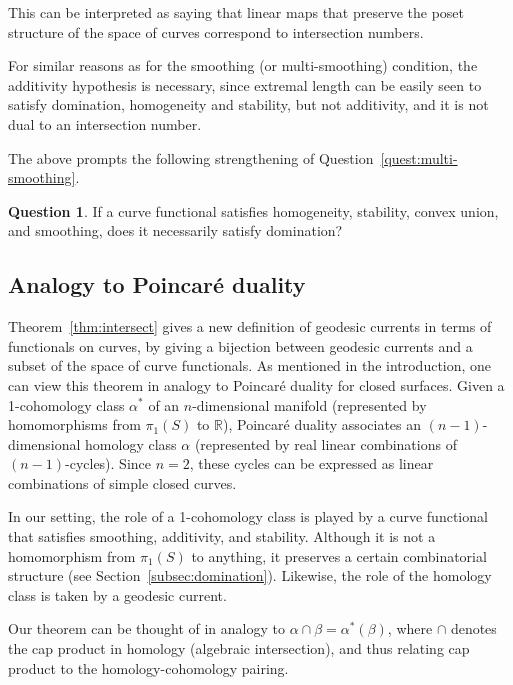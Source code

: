 \documentclass[11pt]{amsart}
\numberwithin{equation}{section}
\numberwithin{figure}{section}
\theoremstyle{definition}
\newtheorem{question}[theorem]{Question}
\theoremstyle{plain}
\begin{document}
This can be interpreted as saying that linear maps that preserve the poset structure of the space of curves correspond to intersection numbers.

For similar reasons as for the smoothing (or multi-smoothing) condition, the additivity hypothesis is necessary, since extremal length can be easily seen to satisfy domination, homogeneity and stability, but not additivity, and it is not dual to an intersection number.

The above prompts the following strengthening of
Question~\ref{quest:multi-smoothing}.

\begin{question}
If a curve functional satisfies homogeneity, stability,
convex union, and smoothing, does it necessarily satisfy domination?
\end{question}






\subsection{Analogy to Poincar\'e duality}
\label{subsec:poincare_duality}
Theorem~\ref{thm:intersect} gives a new definition of geodesic currents in terms of functionals on curves, by giving a bijection between geodesic currents and a subset of the space of curve functionals.
As mentioned in the introduction, one can view this theorem in analogy to Poincaré duality for closed surfaces.  Given a 1-cohomology class $\alpha^*$ of an $n$-dimensional manifold (represented by homomorphisms from $\pi_1(S)$ to $\mathbb{R}$), Poincaré duality associates an $(n-1)$-dimensional homology class $\alpha$ (represented by real linear combinations of $(n-1)$-cycles). Since $n=2$, these cycles can be expressed as linear combinations of simple closed curves.  

In our setting, the role of a 1-cohomology class is played by a curve
functional that satisfies smoothing, additivity, and
stability. Although it is not a homomorphism from
$\pi_1(S)$ to anything, it preserves a certain combinatorial structure
(see Section~\ref{subsec:domination}). Likewise, the role of the homology
class is taken by a geodesic current.

Our theorem can be thought of in analogy to $\alpha \cap \beta =
  \alpha^*(\beta)$, where $\cap$ denotes the cap product in homology (algebraic intersection), and thus relating cap product to the homology-cohomology pairing.
\end{document}
